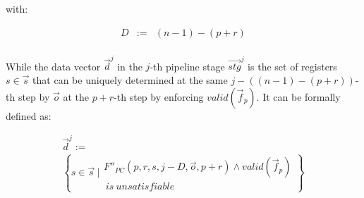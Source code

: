\documentclass[conference]{IEEEtran}
\begin{document}
with:

\begin{equation}\label{stgn_def}
\begin{array}{ccc}
D             & := & (n-1)-(p+r)\\
\end{array}
\end{equation}

While the data vector $\vec{d}^j$ in the $j$-th pipeline stage $\vec{stg}^j$
is the set of registers $s\in \vec{s}$ 
that can be uniquely determined at the same $j-((n-1)-(p+r))$-th step 
by $\vec{o}$ at the $p+r$-th step by enforcing $valid(\vec{f}_p)$.
It can be formally defined as:

\begin{multline}\label{stgn_dj}
\vec{d}^{j} := \\
 \left\{
 s\in \vec{s} ~| 
 \begin{array}{cc}
 F''_{PC}(p,r,s,j-D,\vec{o},p+r)\wedge valid(\vec{f}_p)\\
 ~is~unsatisfiable
 \end{array}
\right\}
\end{multline}



% 
% 
% 
\end{document}
